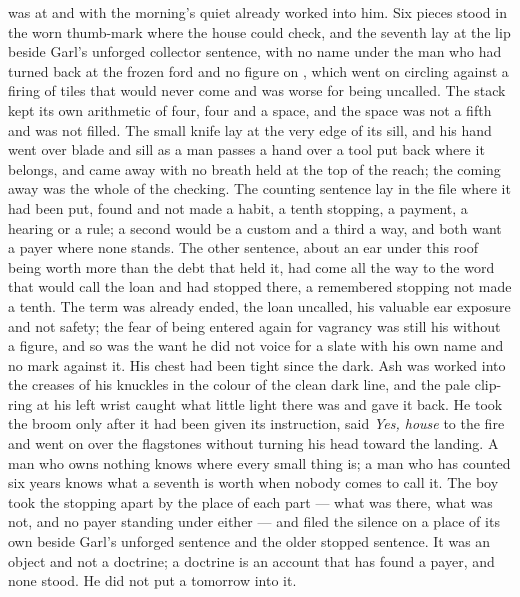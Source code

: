  was at  and  with the morning's quiet already worked into him. Six pieces stood in the worn thumb-mark where the house could check, and the seventh lay at the lip beside Garl's unforged collector sentence, with no name under the man who had turned back at the frozen ford and no figure on , which went on circling against a firing of tiles that would never come and was worse for being uncalled. The stack kept its own arithmetic of four, four and a space, and the space was not a fifth and was not filled. The small knife lay at the very edge of its sill, and his hand went over blade and sill as a man passes a hand over a tool put back where it belongs, and came away with no breath held at the top of the reach; the coming away was the whole of the checking. The counting sentence lay in the file where it had been put, found and not made a habit, a tenth stopping, a payment, a hearing or a rule; a second would be a custom and a third a way, and both want a payer where none stands. The other sentence, about an ear under this roof being worth more than the debt that held it, had come all the way to the word that would call the loan and had stopped there, a remembered stopping not made a tenth. The term was already ended, the loan uncalled, his valuable ear exposure and not safety; the fear of being entered again for vagrancy was still his without a figure, and so was the want he did not voice for a slate with his own name and no mark against it. His chest had been tight since the dark. Ash was worked into the creases of his knuckles in the colour of the clean dark line, and the pale clip-ring at his left wrist caught what little light there was and gave it back. He took the broom only after it had been given its instruction, said \emph{Yes, house} to the fire and went on over the flagstones without turning his head toward the landing. A man who owns nothing knows where every small thing is; a man who has counted six years knows what a seventh is worth when nobody comes to call it. The boy took the stopping apart by the place of each part --- what was there, what was not, and no payer standing under either --- and filed the silence on a place of its own beside Garl's unforged sentence and the older stopped sentence. It was an object and not a doctrine; a doctrine is an account that has found a payer, and none stood. He did not put a tomorrow into it.

